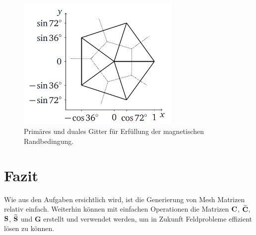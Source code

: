 \documentclass[Protokollheft.tex]{subfiles}
\begin{document}
\begin{figure}[h]
	\centering
	\includegraphics[width=0.7\textwidth]{Duales_Gitter_1.png}
	\caption{Primäres und duales Gitter für Erfüllung der magnetischen Randbedingung.}
	\label{Abb:mgn_Rand_2}
\end{figure}



\section{Fazit}
Wie aus den Aufgaben ersichtlich wird, ist die Generierung von Mesh Matrizen relativ einfach. Weiterhin können mit einfachen Operationen die Matrizen $\mathbf{C}$, $\widetilde{\mathbf{C}}$, $\mathbf{S}$, $\widetilde{\mathbf{S}}$ und $\mathbf{G}$ erstellt und verwendet werden, um in Zukunft Feldprobleme effizient lösen zu können. 
\end{document}
